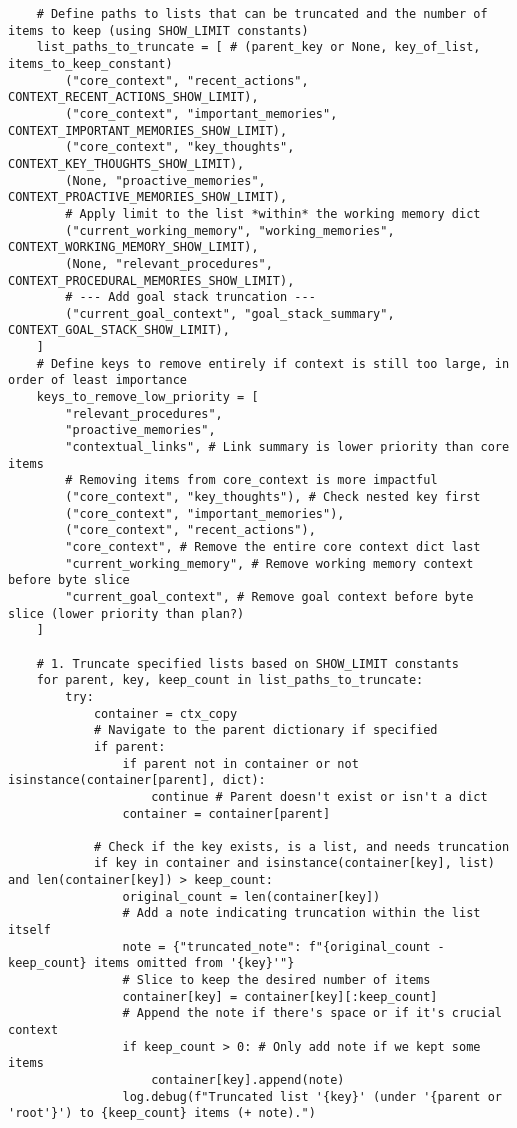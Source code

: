 \documentclass[12pt,a4paper]{article}
\begin{document}
\begin{pageablecode}
\begin{verbatim}
    # Define paths to lists that can be truncated and the number of items to keep (using SHOW_LIMIT constants)
    list_paths_to_truncate = [ # (parent_key or None, key_of_list, items_to_keep_constant)
        ("core_context", "recent_actions", CONTEXT_RECENT_ACTIONS_SHOW_LIMIT),
        ("core_context", "important_memories", CONTEXT_IMPORTANT_MEMORIES_SHOW_LIMIT),
        ("core_context", "key_thoughts", CONTEXT_KEY_THOUGHTS_SHOW_LIMIT),
        (None, "proactive_memories", CONTEXT_PROACTIVE_MEMORIES_SHOW_LIMIT),
        # Apply limit to the list *within* the working memory dict
        ("current_working_memory", "working_memories", CONTEXT_WORKING_MEMORY_SHOW_LIMIT),
        (None, "relevant_procedures", CONTEXT_PROCEDURAL_MEMORIES_SHOW_LIMIT),
        # --- Add goal stack truncation ---
        ("current_goal_context", "goal_stack_summary", CONTEXT_GOAL_STACK_SHOW_LIMIT),
    ]
    # Define keys to remove entirely if context is still too large, in order of least importance
    keys_to_remove_low_priority = [
        "relevant_procedures",
        "proactive_memories",
        "contextual_links", # Link summary is lower priority than core items
        # Removing items from core_context is more impactful
        ("core_context", "key_thoughts"), # Check nested key first
        ("core_context", "important_memories"),
        ("core_context", "recent_actions"),
        "core_context", # Remove the entire core context dict last
        "current_working_memory", # Remove working memory context before byte slice
        "current_goal_context", # Remove goal context before byte slice (lower priority than plan?)
    ]

    # 1. Truncate specified lists based on SHOW_LIMIT constants
    for parent, key, keep_count in list_paths_to_truncate:
        try:
            container = ctx_copy
            # Navigate to the parent dictionary if specified
            if parent:
                if parent not in container or not isinstance(container[parent], dict):
                    continue # Parent doesn't exist or isn't a dict
                container = container[parent]

            # Check if the key exists, is a list, and needs truncation
            if key in container and isinstance(container[key], list) and len(container[key]) > keep_count:
                original_count = len(container[key])
                # Add a note indicating truncation within the list itself
                note = {"truncated_note": f"{original_count - keep_count} items omitted from '{key}'"}
                # Slice to keep the desired number of items
                container[key] = container[key][:keep_count]
                # Append the note if there's space or if it's crucial context
                if keep_count > 0: # Only add note if we kept some items
                    container[key].append(note)
                log.debug(f"Truncated list '{key}' (under '{parent or 'root'}') to {keep_count} items (+ note).")


\end{verbatim}
\end{pageablecode}
\end{document}
